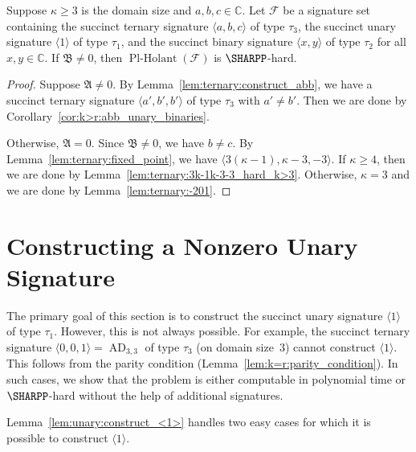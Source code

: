 \documentclass[11pt]{article}
\newcommand{\PlHolant}{\operatorname{Pl-Holant}}
\newcommand{\AD}{\operatorname{AD}}
\begin{document}
\begin{lemma} \label{lem:ternary}
 Suppose $\kappa \ge 3$ is the domain size and $a,b,c \in \mathbb{C}$.
 Let $\mathcal{F}$ be a signature set containing the succinct ternary signature $\langle a, b, c \rangle$ of type $\tau_3$,
 the succinct unary signature $\langle 1 \rangle$ of type $\tau_1$,
 and the succinct binary signature $\langle x, y \rangle$ of type $\tau_2$ for all $x,y \in \mathbb{C}$.
 If $\mathfrak{B} \ne 0$,
 then $\PlHolant(\mathcal{F})$ is $\SHARPP$-hard.
\end{lemma}

\begin{proof}
 Suppose $\mathfrak{A} \ne 0$.
 By Lemma~\ref{lem:ternary:construct_abb},
 we have a succinct ternary signature $\langle a', b', b' \rangle$ of type $\tau_3$ with $a' \ne b'$.
 Then we are done by Corollary~\ref{cor:k>r:abb_unary_binaries}.
 
 Otherwise, $\mathfrak{A} = 0$.
 Since $\mathfrak{B} \ne 0$,
 we have $b \ne c$.
 By Lemma~\ref{lem:ternary:fixed_point},
 we have $\langle 3 (\kappa - 1), \kappa - 3, -3 \rangle$.
 If $\kappa \ge 4$,
 then we are done by Lemma~\ref{lem:ternary:3k-1k-3-3_hard_k>3}.
 Otherwise, $\kappa = 3$ and we are done by Lemma~\ref{lem:ternary:-201}.
\end{proof}

\section{Constructing a Nonzero Unary Signature} \label{sec:unary}

The primary goal of this section is to construct the succinct unary signature $\langle 1 \rangle$ of type $\tau_1$.
However, this is not always possible.
For example,
the succinct ternary signature $\langle 0,0,1 \rangle = \AD_{3,3}$ of type $\tau_3$ (on domain size~$3$) cannot construct $\langle 1 \rangle$.
This follows from the parity condition (Lemma~\ref{lem:k=r:parity_condition}).
In such cases,
we show that the problem is either computable in polynomial time or $\SHARPP$-hard without the help of additional signatures.

Lemma~\ref{lem:unary:construct_<1>} handles two easy cases for which it is possible to construct $\langle 1 \rangle$.
\end{document}
